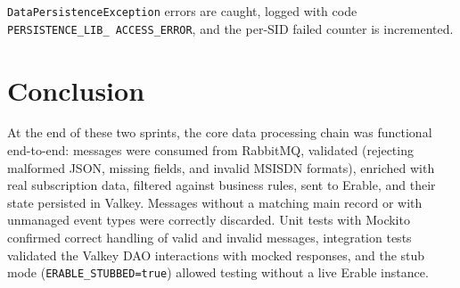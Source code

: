\texttt{DataPersistenceException} errors are caught, logged with code \texttt{PERSISTENCE\_LIB\_ ACCESS\_ERROR}, and the per-SID failed counter is incremented.

\section*{Conclusion}

At the end of these two sprints, the core data processing chain was functional end-to-end: messages were consumed from RabbitMQ, validated (rejecting malformed JSON, missing fields, and invalid MSISDN formats), enriched with real subscription data, filtered against business rules, sent to Erable, and their state persisted in Valkey. Messages without a matching main record or with unmanaged event types were correctly discarded. Unit tests with Mockito confirmed correct handling of valid and invalid messages, integration tests validated the Valkey DAO interactions with mocked responses, and the stub mode (\texttt{ERABLE\_STUBBED=true}) allowed testing without a live Erable instance.


